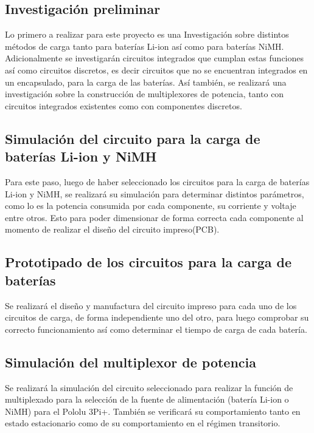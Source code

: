 \subsection*{Investigación preliminar}

Lo primero a realizar para este proyecto es una Investigación sobre distintos
métodos de carga tanto para baterías Li-ion así como para baterías NiMH. Adicionalmente
se investigarán circuitos integrados que cumplan estas funciones así como circuitos
discretos, es decir circuitos que no se encuentran integrados en un encapsulado, para 
la carga de las baterías.  Así también, se realizará una investigación sobre la construcción
de multiplexores de potencia, tanto con circuitos integrados existentes como con componentes
discretos.

\subsection*{Simulación del circuito para la carga de baterías Li-ion y NiMH}

Para este paso, luego de haber seleccionado los circuitos para la carga de baterías
Li-ion y NiMH, se realizará su simulación para determinar distintos parámetros, como lo 
es la potencia consumida por cada componente, su corriente y voltaje entre otros.
Esto para poder dimensionar de forma correcta cada componente al momento de realizar 
el diseño del circuito impreso(PCB).

\subsection*{Prototipado de los circuitos para la carga de baterías}

Se realizará el diseño y manufactura del circuito impreso para cada uno
de los circuitos de carga, de forma independiente uno del otro, para luego
comprobar su correcto funcionamiento así como determinar el tiempo de carga
de cada batería.

\subsection*{Simulación del multiplexor de potencia}

Se realizará la simulación del circuito seleccionado para realizar la función
de multiplexado para la selección de la fuente de alimentación (batería Li-ion
o NiMH) para el Pololu 3Pi+. También se verificará su comportamiento tanto
en estado estacionario como de su comportamiento en el régimen transitorio.

